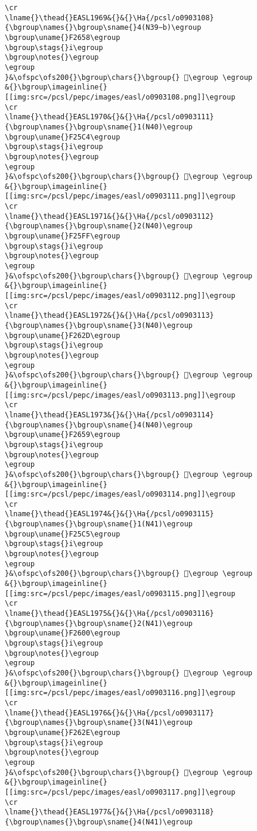 \begin{verbatim}
\cr
\lname{}\thead{}EASL1969&{}&{}\Ha{/pcsl/o0903108}{\bgroup\names{}\bgroup\sname{}4(N39∼b)\egroup
\bgroup\uname{}F2658\egroup
\bgroup\stags{}i\egroup
\bgroup\notes{}\egroup
\egroup
}&\ofspc\ofs200{}\bgroup\chars{}\bgroup{} 󲙘\egroup \egroup
&{}\bgroup\imageinline{}[[img:src=/pcsl/pepc/images/easl/o0903108.png]]\egroup
\cr
\lname{}\thead{}EASL1970&{}&{}\Ha{/pcsl/o0903111}{\bgroup\names{}\bgroup\sname{}1(N40)\egroup
\bgroup\uname{}F25C4\egroup
\bgroup\stags{}i\egroup
\bgroup\notes{}\egroup
\egroup
}&\ofspc\ofs200{}\bgroup\chars{}\bgroup{} 󲗄\egroup \egroup
&{}\bgroup\imageinline{}[[img:src=/pcsl/pepc/images/easl/o0903111.png]]\egroup
\cr
\lname{}\thead{}EASL1971&{}&{}\Ha{/pcsl/o0903112}{\bgroup\names{}\bgroup\sname{}2(N40)\egroup
\bgroup\uname{}F25FF\egroup
\bgroup\stags{}i\egroup
\bgroup\notes{}\egroup
\egroup
}&\ofspc\ofs200{}\bgroup\chars{}\bgroup{} 󲗿\egroup \egroup
&{}\bgroup\imageinline{}[[img:src=/pcsl/pepc/images/easl/o0903112.png]]\egroup
\cr
\lname{}\thead{}EASL1972&{}&{}\Ha{/pcsl/o0903113}{\bgroup\names{}\bgroup\sname{}3(N40)\egroup
\bgroup\uname{}F262D\egroup
\bgroup\stags{}i\egroup
\bgroup\notes{}\egroup
\egroup
}&\ofspc\ofs200{}\bgroup\chars{}\bgroup{} 󲘭\egroup \egroup
&{}\bgroup\imageinline{}[[img:src=/pcsl/pepc/images/easl/o0903113.png]]\egroup
\cr
\lname{}\thead{}EASL1973&{}&{}\Ha{/pcsl/o0903114}{\bgroup\names{}\bgroup\sname{}4(N40)\egroup
\bgroup\uname{}F2659\egroup
\bgroup\stags{}i\egroup
\bgroup\notes{}\egroup
\egroup
}&\ofspc\ofs200{}\bgroup\chars{}\bgroup{} 󲙙\egroup \egroup
&{}\bgroup\imageinline{}[[img:src=/pcsl/pepc/images/easl/o0903114.png]]\egroup
\cr
\lname{}\thead{}EASL1974&{}&{}\Ha{/pcsl/o0903115}{\bgroup\names{}\bgroup\sname{}1(N41)\egroup
\bgroup\uname{}F25C5\egroup
\bgroup\stags{}i\egroup
\bgroup\notes{}\egroup
\egroup
}&\ofspc\ofs200{}\bgroup\chars{}\bgroup{} 󲗅\egroup \egroup
&{}\bgroup\imageinline{}[[img:src=/pcsl/pepc/images/easl/o0903115.png]]\egroup
\cr
\lname{}\thead{}EASL1975&{}&{}\Ha{/pcsl/o0903116}{\bgroup\names{}\bgroup\sname{}2(N41)\egroup
\bgroup\uname{}F2600\egroup
\bgroup\stags{}i\egroup
\bgroup\notes{}\egroup
\egroup
}&\ofspc\ofs200{}\bgroup\chars{}\bgroup{} 󲘀\egroup \egroup
&{}\bgroup\imageinline{}[[img:src=/pcsl/pepc/images/easl/o0903116.png]]\egroup
\cr
\lname{}\thead{}EASL1976&{}&{}\Ha{/pcsl/o0903117}{\bgroup\names{}\bgroup\sname{}3(N41)\egroup
\bgroup\uname{}F262E\egroup
\bgroup\stags{}i\egroup
\bgroup\notes{}\egroup
\egroup
}&\ofspc\ofs200{}\bgroup\chars{}\bgroup{} 󲘮\egroup \egroup
&{}\bgroup\imageinline{}[[img:src=/pcsl/pepc/images/easl/o0903117.png]]\egroup
\cr
\lname{}\thead{}EASL1977&{}&{}\Ha{/pcsl/o0903118}{\bgroup\names{}\bgroup\sname{}4(N41)\egroup

\end{verbatim}
